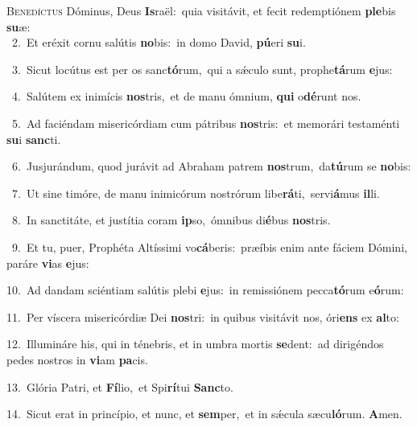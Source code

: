 \lettrine{\initial\textcolor{\initialcolor}{B}}{enedíctus} Dóminus, Deus \textbf{Is}\-raël:~\star quia visitávit, et fecit redemptiónem \textbf{ple}\-bis \textbf{su}\-æ:\\
{\numbfont\textcolor{\numbcolor}{~2.}}~Et eréxit cornu salútis \textbf{no}\-bis:~\star in domo David, \textbf{pú}\-eri \textbf{su}\-i.\par
{\numbfont\textcolor{\numbcolor}{~3.}}~Sicut locútus est per os sanc\-\textbf{tó}\-rum,~\star qui a sǽculo sunt, prophe\-\textbf{tá}\-rum \textbf{e}\-jus:\par
{\numbfont\textcolor{\numbcolor}{~4.}}~Salútem ex inimícis \textbf{nos}\-tris,~\star et de manu ómnium, \textbf{qui} o\-\textbf{dé}\-runt nos.\par
{\numbfont\textcolor{\numbcolor}{~5.}}~Ad faciéndam misericórdiam cum pátribus \textbf{nos}\-tris:~\star et memorári testaménti \textbf{su}\-i \textbf{sanc}\-ti.\par
{\numbfont\textcolor{\numbcolor}{~6.}}~Jusjurándum, quod jurávit ad Abraham patrem \textbf{nos}\-trum,~\star da\-\textbf{tú}\-rum se \textbf{no}\-bis:\par
{\numbfont\textcolor{\numbcolor}{~7.}}~Ut sine timóre, de manu inimicórum nostrórum libe\-\textbf{rá}\-ti,~\star servi\-\textbf{á}\-mus \textbf{il}\-li.\par
{\numbfont\textcolor{\numbcolor}{~8.}}~In sanctitáte, et justítia coram \textbf{ip}\-so,~\star ómnibus di\-\textbf{é}\-bus \textbf{nos}\-tris.\par
{\numbfont\textcolor{\numbcolor}{~9.}}~Et tu, puer, Prophéta Altíssimi vo\-\textbf{cá}\-beris:~\star præíbis enim ante fáciem Dómini, paráre \textbf{vi}\-as \textbf{e}\-jus:\par
{\numbfont\textcolor{\numbcolor}{10.}}~Ad dandam sciéntiam salútis plebi \textbf{e}\-jus:~\star in remissiónem pecca\-\textbf{tó}\-rum e\-\textbf{ó}\-rum:\par
{\numbfont\textcolor{\numbcolor}{11.}}~Per víscera misericórdiæ Dei \textbf{nos}\-tri:~\star in quibus visitávit nos, óri\textbf{ens} ex \textbf{al}\-to:\par
{\numbfont\textcolor{\numbcolor}{12.}}~Illumináre his, qui in ténebris, et in umbra mortis \textbf{se}\-dent:~\star ad dirigéndos pedes nostros in \textbf{vi}\-am \textbf{pa}\-cis.\par
{\numbfont\textcolor{\numbcolor}{13.}}~Glória Patri, et \textbf{Fí}\-lio,~\star et Spi\-\textbf{rí}\-tui \textbf{Sanc}\-to.\par
{\numbfont\textcolor{\numbcolor}{14.}}~Sicut erat in princípio, et nunc, et \textbf{sem}\-per,~\star et in sǽcula sæcu\-\textbf{ló}\-rum. \textbf{A}\-men.\par
